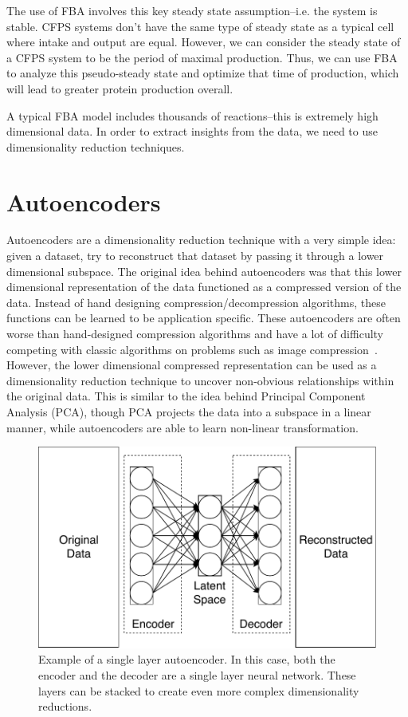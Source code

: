 The use of FBA involves this key steady state assumption--i.e. the system is stable.
CFPS systems don't have the same type of steady state as a typical cell where intake and output are equal.
However, we can consider the steady state of a CFPS system to be the period of maximal production.
Thus, we can use FBA to analyze this pseudo-steady state and optimize that time of production, which will lead to greater protein production overall.

A typical FBA model includes thousands of reactions--this is extremely high dimensional data.
In order to extract insights from the data, we need to use dimensionality reduction techniques.

\section{Autoencoders}
Autoencoders are a dimensionality reduction technique with a very simple idea: given a dataset, try to reconstruct that dataset by passing it through a lower dimensional subspace.
The original idea behind autoencoders was that this lower dimensional representation of the data functioned as a compressed version of the data.
Instead of hand designing compression/decompression algorithms, these functions can be learned to be application specific.
These autoencoders are often worse than hand-designed compression algorithms and have a lot of difficulty competing with classic algorithms on problems such as image compression~\cite{theis2017lossy}.
However, the lower dimensional compressed representation can be used as a dimensionality reduction technique to uncover non-obvious relationships within the original data.
This is similar to the idea behind Principal Component Analysis (PCA), though PCA projects the data into a subspace in a linear manner, while autoencoders are able to learn non-linear transformation.

\begin{figure}[t!]
\begin{center}
\includegraphics{figs/Autoencoder.pdf}
\caption{Example of a single layer autoencoder.
In this case, both the encoder and the decoder are a single layer neural network.
These layers can be stacked to create even more complex dimensionality reductions.}
\end{center}
\label{fig:ae}
\end{figure}

